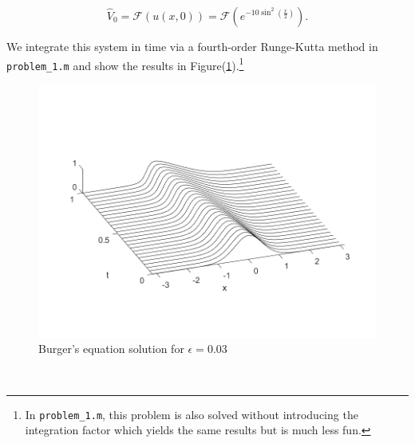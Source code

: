 \begin{solution}
  $$
  \widehat{V}_0 = \mathcal{F}(u(x, 0)) = \mathcal{F}\left( e^{-10 \sin^2{\left( \frac{x}{2} \right)}} \right).
  $$

  We integrate this system in time via a fourth-order Runge-Kutta method in \texttt{problem\_1.m} and show the results
  in Figure(\ref{fig:problem_1}).\footnote{
    In \texttt{problem\_1.m}, this problem is also solved without introducing the integration factor which yields the
    same results but is much less fun.
  }

  \begin{figure}[h]
    \centering
    \includegraphics*[width=.9\textwidth]{problem_1.png}
    \caption{Burger's equation solution for $\epsilon = 0.03$}
    \label{fig:problem_1}
  \end{figure}
  \ \\
\end{solution}